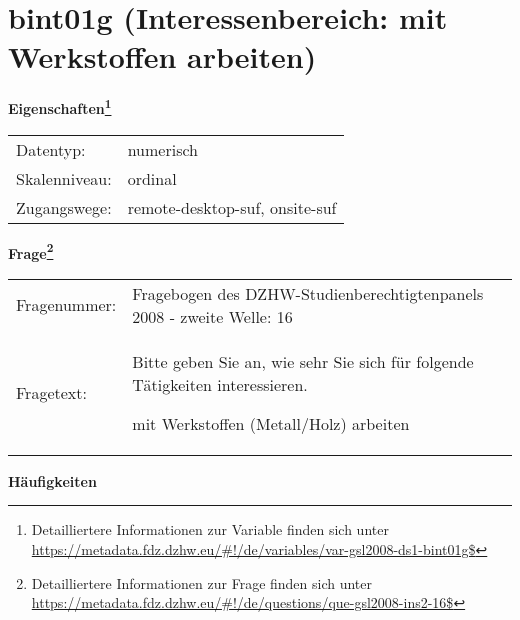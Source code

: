 
    \setcounter{footnote}{0}

    \vspace*{-1.8cm}
	\section{bint01g (Interessenbereich: mit Werkstoffen arbeiten)}
	\label{section:bint01g}



    \vspace*{0.5cm}
    \noindent\textbf{Eigenschaften\footnote{Detailliertere Informationen zur Variable finden sich unter
		\url{https://metadata.fdz.dzhw.eu/\#!/de/variables/var-gsl2008-ds1-bint01g$}}}\\
	\begin{tabularx}{\hsize}{@{}lX}
	Datentyp: & numerisch \\
	Skalenniveau: & ordinal \\
	Zugangswege: &
	  remote-desktop-suf, 
	  onsite-suf
 \\
    \end{tabularx}



				\vspace*{0.5cm}
                \noindent\textbf{Frage\footnote{Detailliertere Informationen zur Frage finden sich unter
		              \url{https://metadata.fdz.dzhw.eu/\#!/de/questions/que-gsl2008-ins2-16$}}}\\
				\begin{tabularx}{\hsize}{@{}lX}
					Fragenummer: &
					  Fragebogen des DZHW-Studienberechtigtenpanels 2008 - zweite Welle:
					  16
 \\
					Fragetext: & Bitte geben Sie an, wie sehr Sie sich für folgende Tätigkeiten interessieren.\par  mit Werkstoffen (Metall/Holz) arbeiten \\
				\end{tabularx}





        		\vspace*{0.5cm}
                \noindent\textbf{Häufigkeiten}

